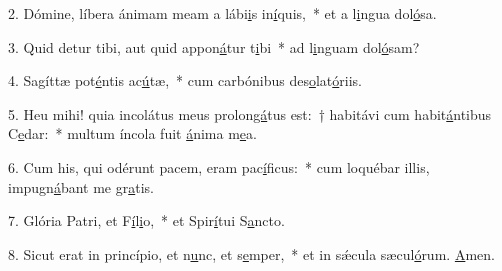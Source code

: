 2. Dómine, líbera ánimam meam a lábi\uline{i}s in\uline{í}quis,~* et a l\uline{i}ngua dol\uline{ó}sa.\par 
3. Quid detur tibi, aut quid appon\uline{á}tur t\uline{i}bi~* ad l\uline{i}nguam dol\uline{ó}sam?\par 
4. Sagíttæ pot\uline{é}ntis ac\uline{ú}tæ,~* cum carbónibus des\uline{o}lat\uline{ó}riis.\par 
5. Heu mihi! quia incolátus meus prolon\uline{gá}tus est:~† habitávi cum habit\uline{á}ntibus C\uline{e}dar:~* multum íncola fuit \uline{á}nima m\uline{e}a.\par 
6. Cum his, qui odérunt pacem, eram pac\uline{í}f\uline{i}cus:~* cum loquébar illis, impugn\uline{á}bant me gr\uline{a}tis.\par 
7. Glória Patri, et F\uline{í}l\uline{i}o,~* et Spir\uline{í}tui S\uline{a}ncto.\par 
8. Sicut erat in princípio, et n\uline{u}nc, et s\uline{e}mper,~* et in sǽcula sæcul\uline{ó}rum. \uline{A}men.\par 
